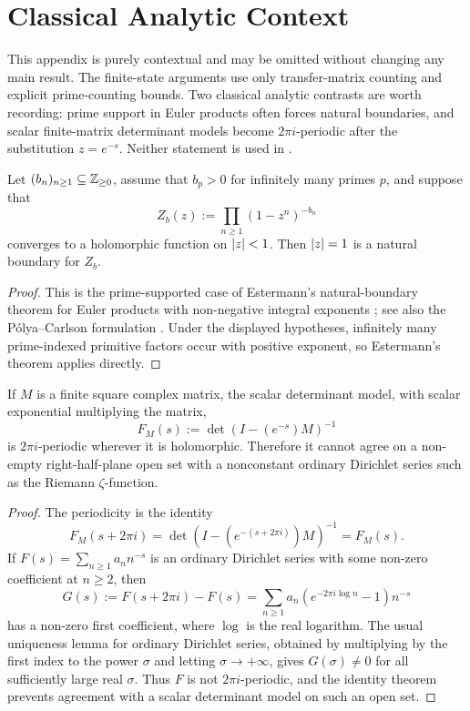 \section{Classical Analytic Context}
\label{sec:analytic}

This appendix is purely contextual and may be omitted without changing
any main result. The finite-state arguments use only transfer-matrix
counting and explicit prime-counting bounds. Two classical analytic
contrasts are worth recording: prime support in Euler products often
forces natural boundaries, and scalar finite-matrix determinant models
become \(2\pi i\)-periodic after the substitution \(z=e^{-s}\). Neither
statement is used in
.

\begin{theorem}
  \label{thm:euler-product-natural-boundary}
  Let \((b_n)_{n\ge1}\subseteq\mathbb{Z}_{\ge0}\), assume that \(b_p>0\) for
  infinitely many primes \(p\), and suppose that
  \[
    Z_b(z):=\prod_{n\ge1}(1-z^n)^{-b_n}
  \]
  converges to a holomorphic function on \(\lvert z \rvert<1\). Then
  \(\lvert z \rvert=1\) is a natural boundary for \(Z_b\).
\end{theorem}

\begin{proof}
  This is the prime-supported case of Estermann's natural-boundary
  theorem for Euler products with non-negative integral exponents
  \cite{Estermann1928}; see also the P\'olya--Carlson formulation
  \cite{Polya1923,Carlson1921}. Under the displayed hypotheses,
  infinitely many prime-indexed primitive factors occur with positive
  exponent, so Estermann's theorem applies directly.
\end{proof}

\begin{proposition}
  \label{prop:finite-zeta-imaginary-periodicity}
  If \(M\) is a finite square complex matrix, the scalar determinant
  model, with scalar exponential multiplying the matrix,
  \[
    F_M(s):=\det(I-(e^{-s})M)^{-1}
  \]
  is \(2\pi i\)-periodic wherever it is holomorphic. Therefore it
  cannot agree on a non-empty right-half-plane open set with a
  nonconstant ordinary Dirichlet series such as the Riemann
  \(\zeta\)-function.
\end{proposition}

\begin{proof}
  The periodicity is the identity
  \[
    F_M(s+2\pi i)
    =\det(I-(e^{-(s+2\pi i)})M)^{-1}
    =F_M(s).
  \]
  If \(F(s)=\sum_{n\ge1}a_nn^{-s}\) is an ordinary Dirichlet series with
  some non-zero coefficient at \(n\ge2\), then
  \[
    G(s):=F(s+2\pi i)-F(s)
      =\sum_{n\ge1}a_n(e^{-2\pi i\log n}-1)n^{-s}
  \]
  has a non-zero first coefficient, where \(\log\) is the real
  logarithm. The usual uniqueness lemma for ordinary Dirichlet series,
  obtained by multiplying by the first index to the power \(\sigma\)
  and letting \(\sigma\to+\infty\), gives \(G(\sigma)\ne0\) for all
  sufficiently large real \(\sigma\). Thus \(F\) is not
  \(2\pi i\)-periodic, and the identity theorem prevents agreement with
  a scalar determinant model on such an open set.
\end{proof}
